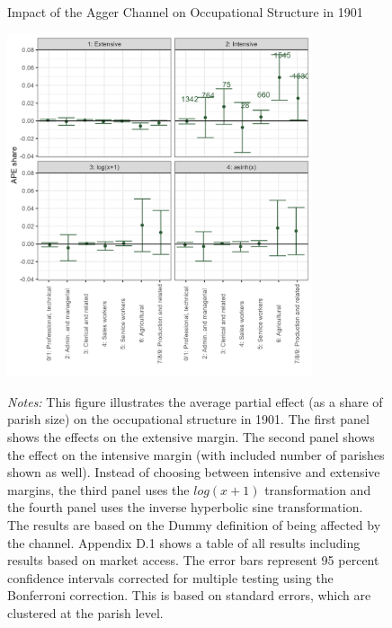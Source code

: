 \documentclass[11pt]{article}
\begin{document}
\begin{figure}
\begin{center}
  \caption{Impact of the Agger Channel on Occupational Structure in 1901} \label{fig:mech_occ}
  \includegraphics[width=0.8\textwidth]{Plots/Mechanism/All_occupations_dummy.png}
  \parbox{0.9\textwidth}{
  \caption*{\footnotesize \textit{Notes:} This figure illustrates the average partial effect (as a share of parish size) on the occupational structure in 1901. The first panel shows the effects on the extensive margin. The second panel shows the effect on the intensive margin (with included number of parishes shown as well). Instead of choosing between intensive and extensive margins, the third panel uses the $log(x+1)$ transformation and the fourth panel uses the inverse hyperbolic sine transformation. The results are based on the Dummy definition of being affected by the channel. Appendix D.1 shows a table of all results including results based on market access. The error bars represent 95 percent confidence intervals corrected for multiple testing using the Bonferroni correction. This is based on standard errors, which are clustered at the parish level.}
}
\end{center}
\end{figure}
\end{document}
